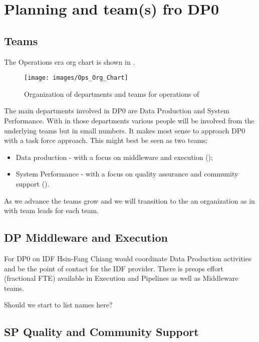 \section{Planning and team(s) fro DP0} \label{sec:plan}


\subsection {Teams}

The Operations era org chart is shown in .


\begin{figure}
\texttt{[image: images/Ops\_Org\_Chart]}
\caption{ Organization of departments and teams  for operations of \RO \label{fig:org}}
\end{figure}

The main departments involved in DP0 are Data Production and System Performance. With in those departments various people will be involved from the underlying teams but in small numbers. It makes most sense to approach DP0 with a task force approach. This might best be seen as two teams:

\begin{itemize}
\item Data production - with a focus on middleware and execution ();
\item System Performance - with a focus on quality assurance and community support ().
\end{itemize}

As we advance the teams grow and we will transition to the an organization as in 
with team leads for each team.

\subsection{DP Middleware and Execution}\label{sec:dp}
For DP0 on IDF Hsin-Fang Chiang would coordinate Data Production activities and be the point
of contact for the IDF provider.
There is preops effort (fractional FTE) available in Execution and Pipelines as well as Middleware teams.

{\color{red} Should we start to list names here?}

\subsection{SP Quality  and Community Support} \label{sec:sp}


